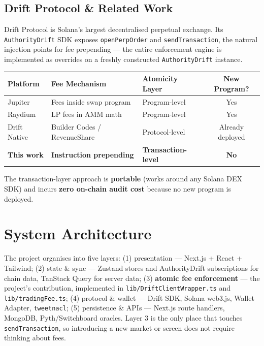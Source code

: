 \documentclass[11pt,a4paper]{article}
\begin{document}
\subsection{Drift Protocol \& Related Work}

Drift Protocol is Solana's largest decentralised perpetual exchange. Its \texttt{AuthorityDrift} SDK exposes \texttt{openPerpOrder} and \texttt{sendTransaction}, the natural injection points for fee prepending --- the entire enforcement engine is implemented as overrides on a freshly constructed \texttt{AuthorityDrift} instance.

\begin{center}
\begin{tabular}{l l l c}
\toprule
\textbf{Platform} & \textbf{Fee Mechanism} & \textbf{Atomicity Layer} & \textbf{New Program?} \\
\midrule
Jupiter & Fees inside swap program & Program-level & Yes \\
Raydium & LP fees in AMM math & Program-level & Yes \\
Drift Native & Builder Codes / RevenueShare & Protocol-level & Already deployed \\
\textbf{This work} & \textbf{Instruction prepending} & \textbf{Transaction-level} & \textbf{No} \\
\bottomrule
\end{tabular}
\end{center}

The transaction-layer approach is \textbf{portable} (works around any Solana DEX SDK) and incurs \textbf{zero on-chain audit cost} because no new program is deployed.

\section{System Architecture}

The project organises into five layers: (1) presentation --- Next.js + React + Tailwind; (2) state \& sync --- Zustand stores and AuthorityDrift subscriptions for chain data, TanStack Query for server data; (3) \textbf{atomic fee enforcement} --- the project's contribution, implemented in \texttt{lib/DriftClientWrapper.ts} and \texttt{lib/tradingFee.ts}; (4) protocol \& wallet --- Drift SDK, Solana web3.js, Wallet Adapter, \texttt{tweetnacl}; (5) persistence \& APIs --- Next.js route handlers, MongoDB, Pyth/Switchboard oracles. Layer 3 is the only place that touches \texttt{sendTransaction}, so introducing a new market or screen does not require thinking about fees.
\end{document}
